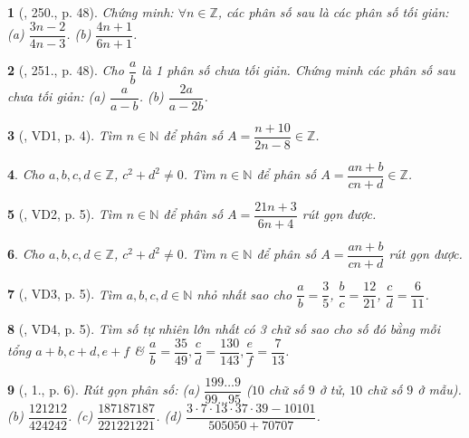 \documentclass{article}
\newtheorem{baitoan}{}
\begin{document}
\begin{baitoan}[\cite{Tuyen_Toan_6}, 250., p. 48]
	Chứng minh: $\forall n\in\mathbb{Z}$, các phân số sau là các phân số tối giản: (a) $\dfrac{3n - 2}{4n - 3}$. (b) $\dfrac{4n + 1}{6n + 1}$.
\end{baitoan}

\begin{baitoan}[\cite{Tuyen_Toan_6}, 251., p. 48]
	Cho $\dfrac{a}{b}$ là 1 phân số chưa tối giản. Chứng minh các phân số sau chưa tối giản: (a) $\dfrac{a}{a - b}$. (b) $\dfrac{2a}{a - 2b}$.
\end{baitoan}

\begin{baitoan}[\cite{Binh_Toan_6_tap_2}, VD1, p. 4]
	Tìm $n\in\mathbb{N}$ để phân số $A = \dfrac{n + 10}{2n - 8}\in\mathbb{Z}$.
\end{baitoan}

\begin{baitoan}
	Cho $a,b,c,d\in\mathbb{Z}$, $c^2 + d^2\ne0$. Tìm $n\in\mathbb{N}$ để phân số $A = \dfrac{an + b}{cn + d}\in\mathbb{Z}$.
\end{baitoan}

\begin{baitoan}[\cite{Binh_Toan_6_tap_2}, VD2, p. 5]
	Tìm $n\in\mathbb{N}$ để phân số $A = \dfrac{21n + 3}{6n + 4}$ rút gọn được.
\end{baitoan}

\begin{baitoan}
	Cho $a,b,c,d\in\mathbb{Z}$, $c^2 + d^2\ne0$. Tìm $n\in\mathbb{N}$ để phân số $A = \dfrac{an + b}{cn + d}$ rút gọn được.
\end{baitoan}

\begin{baitoan}[\cite{Binh_Toan_6_tap_2}, VD3, p. 5]
	Tìm $a,b,c,d\in\mathbb{N}$ nhỏ nhất sao cho $\dfrac{a}{b} = \dfrac{3}{5}$, $\dfrac{b}{c} = \dfrac{12}{21}$, $\dfrac{c}{d} = \dfrac{6}{11}$.
\end{baitoan}

\begin{baitoan}[\cite{Binh_Toan_6_tap_2}, VD4, p. 5]
	Tìm số tự nhiên lớn nhất có 3 chữ số sao cho số đó bằng mỗi tổng $a + b,c + d,e + f$ \& $\dfrac{a}{b} = \dfrac{35}{49},\dfrac{c}{d} = \dfrac{130}{143},\dfrac{e}{f} = \dfrac{7}{13}$.
\end{baitoan}

\begin{baitoan}[\cite{Binh_Toan_6_tap_2}, 1., p. 6]
	Rút gọn phân số: (a) $\dfrac{199\ldots9}{99\ldots95}$ ($10$ chữ số $9$ ở tử, $10$ chữ số $9$ ở mẫu). (b) $\dfrac{121212}{424242}$. (c) $\dfrac{187187187}{221221221}$. (d) $\dfrac{3\cdot7\cdot13\cdot37\cdot39 - 10101}{505050 + 70707}$.
\end{baitoan}
\end{document}
